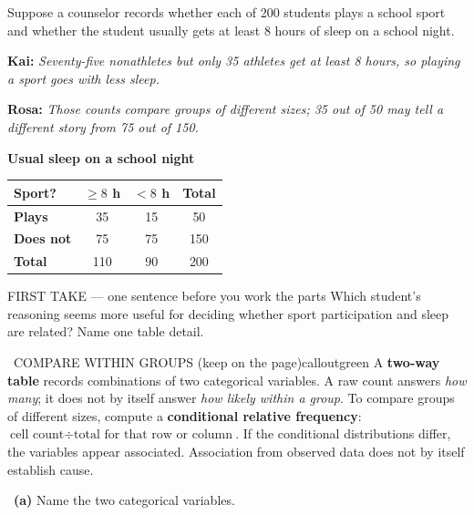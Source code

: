 \documentclass[11pt]{article}
\begin{document}
Suppose a counselor records whether each of 200 students plays a school sport and whether the student usually gets at least 8 hours of sleep on a school night.\par\smallskip \textbf{Kai:} \emph{Seventy-five nonathletes but only 35 athletes get at least 8 hours, so playing a sport goes with less sleep.}\par \textbf{Rosa:} \emph{Those counts compare groups of different sizes; 35 out of 50 may tell a different story from 75 out of 150.}\par
\begin{center}
\textbf{Usual sleep on a school night}\par\smallskip
\begin{tabular}{|l|c|c|c|}
\hline
\textbf{Sport?} & \textbf{$\geq 8$ h} & \textbf{$<8$ h} & \textbf{Total} \\ \hline
\textbf{Plays} & 35 & 15 & 50 \\ \hline
\textbf{Does not} & 75 & 75 & 150 \\ \hline
\textbf{Total} & 110 & 90 & 200 \\ \hline
\end{tabular}
\end{center}
\begin{firsttakebox}{FIRST TAKE --- one sentence before you work the parts}
Which student's reasoning seems more useful for deciding whether sport participation and sleep are related? Name one table detail.\par
{}
\end{firsttakebox}

\begin{callout}{\IconBook\ COMPARE WITHIN GROUPS (keep on the page)}{calloutgreen}
A \textbf{two-way table} records combinations of two categorical variables. A raw count answers
\emph{how many}; it does not by itself answer \emph{how likely within a group}. To compare groups of
different sizes, compute a \textbf{conditional relative frequency}:
$\text{cell count}\div\text{total for that row or column}$. If the conditional distributions differ,
the variables appear associated. Association from observed data does not by itself establish cause.
\end{callout}

~\textbf{(a)} Name the two categorical variables.\par
{}
\end{document}
